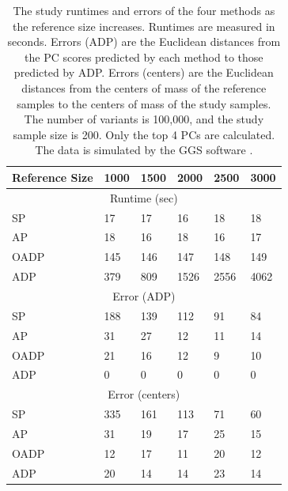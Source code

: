 \documentclass{article}
\begin{document}
\begin{table}[h]
  \centering
  \begin{tabular}{|l|l|l|l|l|l|}
    \hline
    Reference Size & 1000 & 1500 & 2000 & 2500 & 3000 \\
    \hline
    \multicolumn{6}{|c|}{Runtime (sec)} \\
    \hline
    SP         &  17  & 17   & 16   & 18   & 18   \\
    AP         &  18  & 16   & 18  & 16   & 17  \\
    OADP       &  145  & 146   & 147   & 148   & 149   \\
    ADP        &  379  & 809 & 1526 & 2556 & 4062 \\
    \hline
    \multicolumn{6}{|c|}{Error (ADP)} \\
    \hline
    SP         &  188  & 139   & 112   & 91   & 84   \\
    AP         &  31  & 27   & 12  & 11   & 14  \\
    OADP       &  21  & 16   & 12   & 9   & 10   \\
    ADP        &  0  & 0 & 0 & 0 & 0 \\
    \hline
    \multicolumn{6}{|c|}{Error (centers)} \\
    \hline
    SP         &  335 & 161  & 113 & 71  & 60  \\
    AP         &  31  & 19   & 17  & 25  & 15  \\
    OADP       &  12  & 17   & 11  & 20  & 12  \\
    ADP        &  20  & 14   & 14  & 23  & 14  \\
    \hline
  \end{tabular}
  \caption{
    The study runtimes and errors of the four methods
    as the reference size increases.
    Runtimes are measured in seconds.
    Errors (ADP) are the Euclidean distances from
    the PC scores predicted by each method
    to those predicted by ADP.
    Errors (centers) are the Euclidean distances
    from the centers of mass of the reference samples
    to the centers of mass of the study samples.
    The number of variants is 100,000,
    and the study sample size is 200.
    Only the top 4 PCs are calculated.
    The data is simulated by the GGS software \citep{mathieson2012differential}.
    }
    \label{tbl:ggsim}
\end{table}
\end{document}
